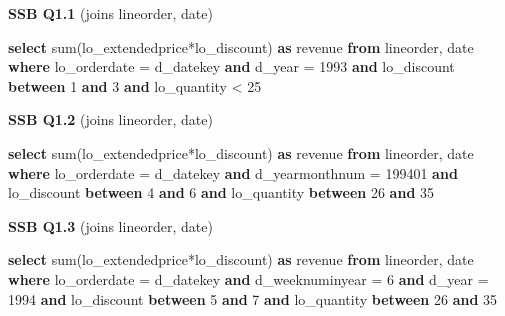 \documentclass[
]{article}
\newenvironment{Shaded}{}{}
\newcommand{\DataTypeTok}[1]{\textcolor[rgb]{0.56,0.13,0.00}{#1}}
\newcommand{\DecValTok}[1]{\textcolor[rgb]{0.25,0.63,0.44}{#1}}
\newcommand{\FunctionTok}[1]{\textcolor[rgb]{0.02,0.16,0.49}{#1}}
\newcommand{\KeywordTok}[1]{\textcolor[rgb]{0.00,0.44,0.13}{\textbf{#1}}}
\newcommand{\NormalTok}[1]{#1}
\newcommand{\OperatorTok}[1]{\textcolor[rgb]{0.40,0.40,0.40}{#1}}
\begin{document}
\textbf{SSB Q1.1} (joins lineorder, date)

\begin{Shaded}
\begin{Highlighting}[]
\KeywordTok{select} \FunctionTok{sum}\NormalTok{(lo\_extendedprice}\OperatorTok{*}\NormalTok{lo\_discount) }\KeywordTok{as}\NormalTok{ revenue}
\KeywordTok{from}\NormalTok{ lineorder, }\DataTypeTok{date}
\KeywordTok{where}\NormalTok{ lo\_orderdate }\OperatorTok{=}\NormalTok{ d\_datekey }\KeywordTok{and}\NormalTok{ d\_year }\OperatorTok{=} \DecValTok{1993} \KeywordTok{and}\NormalTok{ lo\_discount }\KeywordTok{between} \DecValTok{1} \KeywordTok{and} \DecValTok{3} \KeywordTok{and}\NormalTok{ lo\_quantity }\OperatorTok{\textless{}} \DecValTok{25}
\end{Highlighting}
\end{Shaded}

\textbf{SSB Q1.2} (joins lineorder, date)

\begin{Shaded}
\begin{Highlighting}[]
\KeywordTok{select} \FunctionTok{sum}\NormalTok{(lo\_extendedprice}\OperatorTok{*}\NormalTok{lo\_discount) }\KeywordTok{as}\NormalTok{ revenue}
\KeywordTok{from}\NormalTok{ lineorder, }\DataTypeTok{date}
\KeywordTok{where}\NormalTok{ lo\_orderdate }\OperatorTok{=}\NormalTok{ d\_datekey }\KeywordTok{and}\NormalTok{ d\_yearmonthnum }\OperatorTok{=} \DecValTok{199401} \KeywordTok{and}\NormalTok{ lo\_discount }\KeywordTok{between} \DecValTok{4} \KeywordTok{and} \DecValTok{6} \KeywordTok{and}\NormalTok{ lo\_quantity }\KeywordTok{between} \DecValTok{26} \KeywordTok{and} \DecValTok{35}
\end{Highlighting}
\end{Shaded}

\textbf{SSB Q1.3} (joins lineorder, date)

\begin{Shaded}
\begin{Highlighting}[]
\KeywordTok{select} \FunctionTok{sum}\NormalTok{(lo\_extendedprice}\OperatorTok{*}\NormalTok{lo\_discount) }\KeywordTok{as}\NormalTok{ revenue}
\KeywordTok{from}\NormalTok{ lineorder, }\DataTypeTok{date}
\KeywordTok{where}\NormalTok{ lo\_orderdate }\OperatorTok{=}\NormalTok{ d\_datekey }\KeywordTok{and}\NormalTok{ d\_weeknuminyear }\OperatorTok{=} \DecValTok{6} \KeywordTok{and}\NormalTok{ d\_year }\OperatorTok{=} \DecValTok{1994} \KeywordTok{and}\NormalTok{ lo\_discount }\KeywordTok{between} \DecValTok{5} \KeywordTok{and} \DecValTok{7} \KeywordTok{and}\NormalTok{ lo\_quantity }\KeywordTok{between} \DecValTok{26} \KeywordTok{and} \DecValTok{35}
\end{Highlighting}
\end{Shaded}
\end{document}
